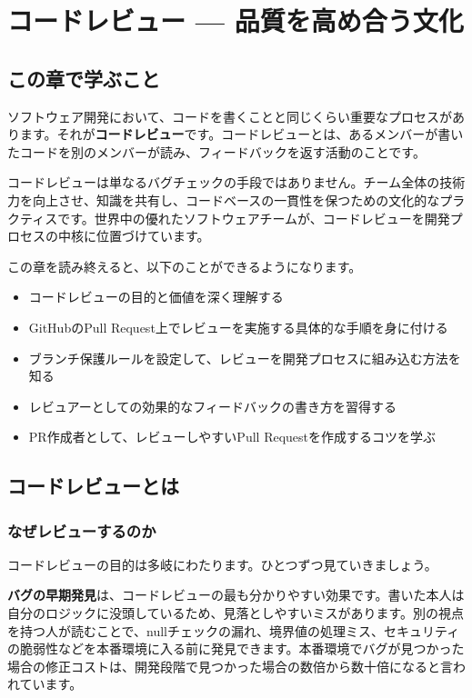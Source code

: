 \chapter{コードレビュー --- 品質を高め合う文化}

\section{この章で学ぶこと}

ソフトウェア開発において、コードを書くことと同じくらい重要なプロセスがあります。それが\textbf{コードレビュー}です。コードレビューとは、あるメンバーが書いたコードを別のメンバーが読み、フィードバックを返す活動のことです。

コードレビューは単なるバグチェックの手段ではありません。チーム全体の技術力を向上させ、知識を共有し、コードベースの一貫性を保つための文化的なプラクティスです。世界中の優れたソフトウェアチームが、コードレビューを開発プロセスの中核に位置づけています。

この章を読み終えると、以下のことができるようになります。

\begin{itemize}
  \item コードレビューの目的と価値を深く理解する
  \item GitHubのPull Request上でレビューを実施する具体的な手順を身に付ける
  \item ブランチ保護ルールを設定して、レビューを開発プロセスに組み込む方法を知る
  \item レビュアーとしての効果的なフィードバックの書き方を習得する
  \item PR作成者として、レビューしやすいPull Requestを作成するコツを学ぶ
\end{itemize}

\section{コードレビューとは}

\subsection{なぜレビューするのか}

コードレビューの目的は多岐にわたります。ひとつずつ見ていきましょう。

\textbf{バグの早期発見}は、コードレビューの最も分かりやすい効果です。書いた本人は自分のロジックに没頭しているため、見落としやすいミスがあります。別の視点を持つ人が読むことで、nullチェックの漏れ、境界値の処理ミス、セキュリティの脆弱性などを本番環境に入る前に発見できます。本番環境でバグが見つかった場合の修正コストは、開発段階で見つかった場合の数倍から数十倍になると言われています。

